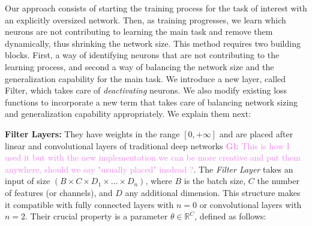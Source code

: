 \documentclass[sigconf]{acmart}
\newcommand{\srm}[1]{\textcolor{red}{{\bf Sam:} #1}}
\newcommand{\gl}[1]{\textcolor{violet}{{\bf Gl:} #1}}
\begin{document}
Our approach consists of starting the training process for the task of interest
with an explicitly oversized network. Then, as training progresses, we learn
which neurons are not contributing to learning the main task and remove them
dynamically, thus shrinking the network size. This method requires two building
blocks. First, a way of identifying neurons that are not contributing to the
learning process, and second a way of balancing the network size and the
generalization capability for the main task. We introduce a new layer, called
\textsf{Filter}, which takes care of \emph{deactivating} neurons. We also modify
existing loss functions to incorporate a new term that takes care of balancing
network sizing and generalization capability appropriately. We explain them
next:

%
%
%


\textbf{Filter Layers: } They have weights in the range $[0,+\infty]$ and are placed after
linear and convolutional layers of traditional deep networks \gl{This is how I
  used it but with the new implementation we can be more creative and put them
  anywhere, should we say "usually placed" insdead ?}. The \textit{Filter
  Layer} takes an input of size $\left(B \times C \times D_1 \times \dots
  \times D_n\right)$, where $B$ is the batch size, $C$ the number of features
(or channels), and $D$ any additional dimension. This structure makes it
compatible with fully connected layers with $n=0$ or convolutional layers with
$n=2$. Their crucial property is a parameter $\theta \in \mathbb{R}^C$, defined
as follows:
\end{document}
